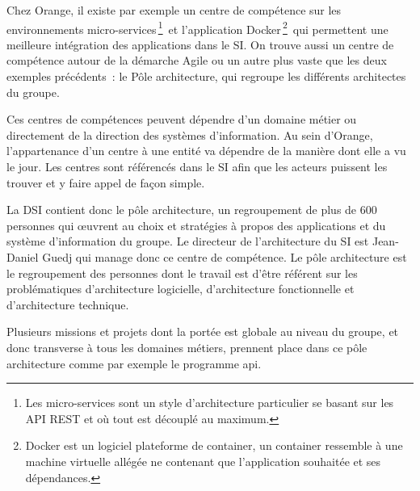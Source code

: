     Chez Orange, il existe par exemple un centre de compétence sur les environnements micro-services\,\footnote{Les micro-services sont un style d'architecture particulier se basant sur les API REST et où tout est découplé au maximum.}\, et l’application Docker\,\footnote{Docker est un logiciel plateforme de container, un container ressemble à une machine virtuelle allégée ne contenant que l'application souhaitée et ses dépendances.}\, qui permettent une meilleure intégration des applications dans le SI.
    On trouve aussi un centre de compétence autour de la démarche Agile ou un autre plus vaste que les deux exemples précédents : le Pôle architecture, qui regroupe les différents architectes du groupe.

    Ces centres de compétences peuvent dépendre d’un domaine métier ou directement de la direction des systèmes d’information.
    Au sein d’Orange, l’appartenance d’un centre à une entité va dépendre de la manière dont elle a vu le jour.
    Les centres sont référencés dans le SI afin que les acteurs puissent les trouver et y faire appel de façon simple.

    La DSI contient donc le pôle architecture, un regroupement de plus de 600 personnes qui œuvrent au choix et stratégies à propos des applications et du système d’information du groupe.
    Le directeur de l’architecture du SI est Jean-Daniel Guedj qui manage donc ce centre de compétence.
    Le pôle architecture est le regroupement des personnes dont le travail est d’être référent sur les problématiques d’architecture logicielle, d’architecture fonctionnelle et d’architecture technique.

    Plusieurs missions et projets dont la portée est globale au niveau du groupe, et donc transverse à tous les domaines métiers, prennent place dans ce pôle architecture comme par exemple le programme api.
